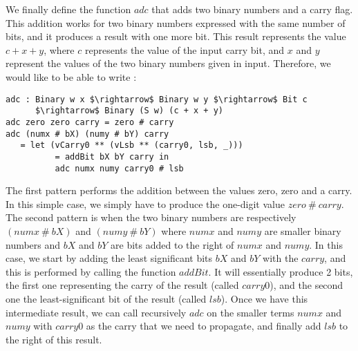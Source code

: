 We finally define the function $adc$ that adds two binary numbers and a carry flag. This addition works for two binary numbers expressed with the same number of bits, and it produces a result with one more bit. This result represents the value $c + x + y$, where $c$ represents the value of the input carry bit, and $x$ and $y$ represent the values of the two binary numbers given in input. Therefore, we would like to be able to write :

\begin{lstlisting}
adc : Binary w x $\rightarrow$ Binary w y $\rightarrow$ Bit c 
      $\rightarrow$ Binary (S w) (c + x + y)
adc zero zero carry = zero # carry
adc (numx # bX) (numy # bY) carry
   = let (vCarry0 ** (vLsb ** (carry0, lsb, _))) 
          = addBit bX bY carry in
          adc numx numy carry0 # lsb
\end{lstlisting}

The first pattern performs the addition between the values zero, zero and a carry. In this simple case, we simply have to produce the one-digit value $zero\ \#\ carry$. The second pattern is when the two binary numbers are respectively $(numx\ \#\ bX)$ and $(numy\ \#\ bY)$ where $numx$ and $numy$ are smaller binary numbers and $bX$ and $bY$ are bits added to the right of $numx$ and $numy$. In this case, we start by adding the least significant bits $bX$ and $bY$ with the $carry$, and this is performed by calling the function $addBit$. It will essentially produce 2 bits, the first one representing the carry of the result (called $carry0$), and the second one the least-significant bit of the result (called $lsb$). Once we have this intermediate result, we can call recursively $adc$ on the smaller terms $numx$ and $numy$ with $carry0$ as the carry that we need to propagate, and finally add $lsb$ to the right of this result.

